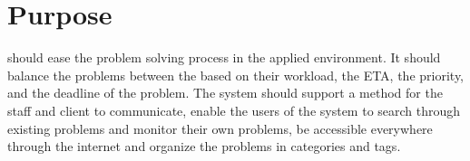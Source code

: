 \section{Purpose}
\hdesk[] should ease the problem solving process in the applied environment. 
It should balance the problems between the \astaff[] based on their workload, the ETA, the priority, and the deadline of the problem.
The system should support a method for the staff and client to communicate, enable the users of the system to search through existing problems and monitor their own problems, be accessible everywhere through the internet and organize the problems in categories and tags. 

